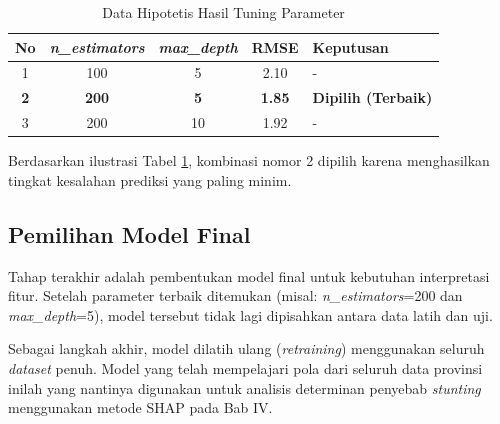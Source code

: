 \begin{table}[H]
    \centering
    \renewcommand{\arraystretch}{1.3}
    \caption{Data Hipotetis Hasil Tuning Parameter}
    \label{tab:tuning_dummy}
    \begin{tabular}{ccccl}
    \toprule
    \textbf{No} & \textbf{\textit{n\_estimators}} & \textbf{\textit{max\_depth}} & \textbf{RMSE} & \textbf{Keputusan} \\
    \midrule
    1 & 100 & 5 & 2.10 & - \\
    \textbf{2} & \textbf{200} & \textbf{5} & \textbf{1.85} & \textbf{Dipilih (Terbaik)} \\
    3 & 200 & 10 & 1.92 & - \\
    \bottomrule
    \end{tabular}
\end{table}

Berdasarkan ilustrasi Tabel \ref{tab:tuning_dummy}, kombinasi nomor 2 dipilih karena menghasilkan tingkat kesalahan prediksi yang paling minim.

\subsection{Pemilihan Model Final}

Tahap terakhir adalah pembentukan model final untuk kebutuhan interpretasi fitur. Setelah parameter terbaik ditemukan (misal: \textit{n\_estimators}=200 dan \textit{max\_depth}=5), model tersebut tidak lagi dipisahkan antara data latih dan uji.

Sebagai langkah akhir, model dilatih ulang (\textit{retraining}) menggunakan seluruh \textit{dataset} penuh. Model yang telah mempelajari pola dari seluruh data provinsi inilah yang nantinya digunakan untuk analisis determinan penyebab \textit{stunting} menggunakan metode SHAP pada Bab IV.